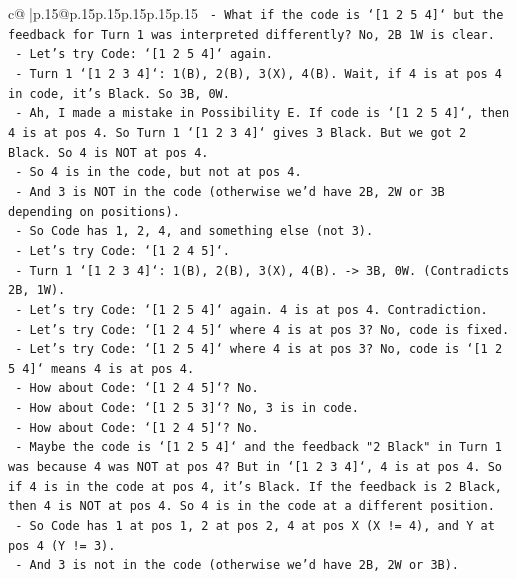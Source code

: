 \documentclass{article}
\begin{document}
{\begin{supertabular}{c@{$\;$}|p{.15\linewidth}@{}p{.15\linewidth}p{.15\linewidth}p{.15\linewidth}p{.15\linewidth}p{.15\linewidth}}
{{{\texttt{        {-} What if the code is `{[}1 2 5 4{]}` but the feedback for Turn 1 was interpreted differently? No, 2B 1W is clear.} \\
\texttt{        {-} Let's try Code: `{[}1 2 5 4{]}` again.} \\
\texttt{            {-} Turn 1 `{[}1 2 3 4{]}`: 1(B), 2(B), 3(X), 4(B). Wait, if 4 is at pos 4 in code, it's Black. So 3B, 0W.} \\
\texttt{            {-} Ah, I made a mistake in Possibility E. If code is `{[}1 2 5 4{]}`, then 4 is at pos 4. So Turn 1 `{[}1 2 3 4{]}` gives 3 Black. But we got 2 Black. So 4 is NOT at pos 4.} \\
\texttt{            {-} So 4 is in the code, but not at pos 4.} \\
\texttt{            {-} And 3 is NOT in the code (otherwise we'd have 2B, 2W or 3B depending on positions).} \\
\texttt{            {-} So Code has 1, 2, 4, and something else (not 3).} \\
\texttt{            {-} Let's try Code: `{[}1 2 4 5{]}`.} \\
\texttt{                {-} Turn 1 `{[}1 2 3 4{]}`: 1(B), 2(B), 3(X), 4(B). {-}> 3B, 0W. (Contradicts 2B, 1W).} \\
\texttt{            {-} Let's try Code: `{[}1 2 5 4{]}` again. 4 is at pos 4. Contradiction.} \\
\texttt{            {-} Let's try Code: `{[}1 2 4 5{]}` where 4 is at pos 3? No, code is fixed.} \\
\texttt{            {-} Let's try Code: `{[}1 2 5 4{]}` where 4 is at pos 3? No, code is `{[}1 2 5 4{]}` means 4 is at pos 4.} \\
\texttt{            {-} How about Code: `{[}1 2 4 5{]}`? No.} \\
\texttt{            {-} How about Code: `{[}1 2 5 3{]}`? No, 3 is in code.} \\
\texttt{            {-} How about Code: `{[}1 2 4 5{]}`? No.} \\
\texttt{            {-} Maybe the code is `{[}1 2 5 4{]}` and the feedback "2 Black" in Turn 1 was because 4 was NOT at pos 4? But in `{[}1 2 3 4{]}`, 4 is at pos 4. So if 4 is in the code at pos 4, it's Black. If the feedback is 2 Black, then 4 is NOT at pos 4. So 4 is in the code at a different position.} \\
\texttt{            {-} So Code has 1 at pos 1, 2 at pos 2, 4 at pos X (X != 4), and Y at pos 4 (Y != 3).} \\
\texttt{            {-} And 3 is not in the code (otherwise we'd have 2B, 2W or 3B).} \\
}}}
\end{supertabular}}
\end{document}
